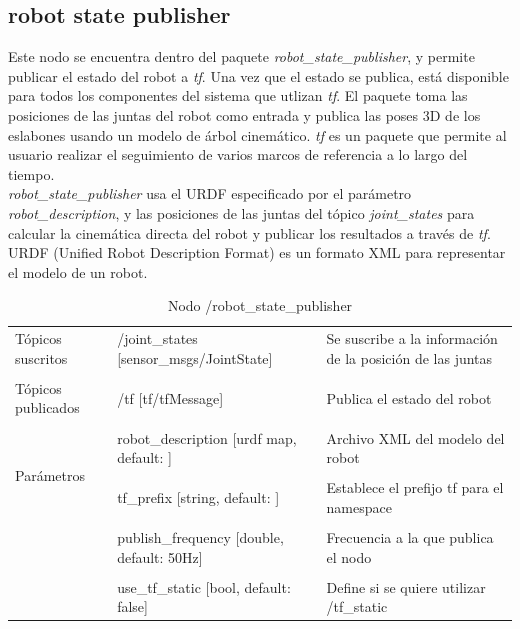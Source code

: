 \documentclass[user_manual.tex]{subfiles}
\begin{document}
\subsection{robot state publisher}
Este nodo se encuentra dentro del paquete \textit{robot\_state\_publisher}, y permite publicar el estado del robot a \textit{tf}. Una vez que el estado se publica, está disponible para todos los componentes del sistema que utlizan \textit{tf}. El paquete toma las posiciones de las juntas del robot como entrada y publica las poses 3D de los eslabones usando un modelo de árbol cinemático. \textit{tf} es un paquete que permite al usuario realizar el seguimiento de varios marcos de referencia a lo largo del tiempo.\\

\textit{robot\_state\_publisher} usa el URDF especificado por el parámetro \textit{robot\_description}, y las posiciones de las juntas del tópico \textit{joint\_states} para calcular la cinemática directa del robot y publicar los resultados a través de \textit{tf}. URDF (Unified Robot Description Format) es un formato  XML para representar el modelo de un robot.

\begin{table}[H]
\begin{center}
\begin{tabular}{|l|l|p{4cm}|}%
\hline

Tópicos suscritos &  /joint\_states [sensor\_msgs/JointState] & Se suscribe a la información de la posición de las juntas \\ 
& & \\
\hline

Tópicos publicados &  /tf [tf/tfMessage] & Publica el estado del robot \\
& & \\
\hline

\multirow{4}{*}{Parámetros} 
&  robot\_description [urdf map, default: ] & Archivo XML del modelo del robot \\
& & \\
& tf\_prefix [string, default: ]  & Establece el prefijo tf para el namespace\\
& & \\
& publish\_frequency [double, default: 50Hz] & Frecuencia a la que publica el nodo\\
& & \\
& use\_tf\_static [bool, default: false]  & Define si se quiere utilizar /tf\_static\\
\cline{1-3}

\end{tabular}
\caption{Nodo /robot\_state\_publisher}
\label{robot state publisher node}
\end{center}
\end{table}
\end{document}
